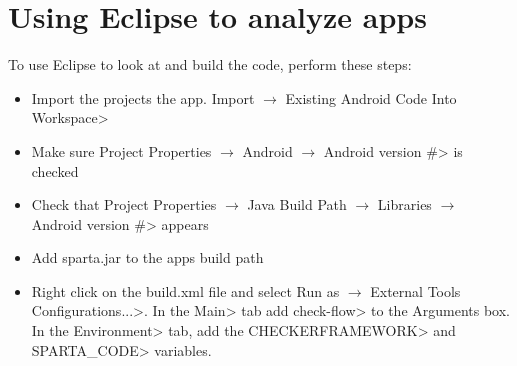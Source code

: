 \section{Using Eclipse to analyze apps}
To use Eclipse to look at and build the code, perform these
steps:
\begin{itemize}
\item
Import the projects the app.      \<Import $\rightarrow$ Existing Android Code
Into Workspace>

    \item
    Make sure
    \<Project Properties $\rightarrow$ Android $\rightarrow$ Android
    version \#> is checked

    \item
    Check that
    \<Project Properties $\rightarrow$ Java Build Path $\rightarrow$
    Libraries $\rightarrow$ Android version \#> appears

    \item
    Add sparta.jar to the apps build path

    \item Right click on the build.xml file and select   \<Run as $\rightarrow$
    External Tools Configurations...>. In the \<Main> tab add \<check-flow> to the
    Arguments box.  In the \<Environment> tab, add the \<CHECKERFRAMEWORK> and
    \<SPARTA\_CODE> variables.

  \end{itemize}




